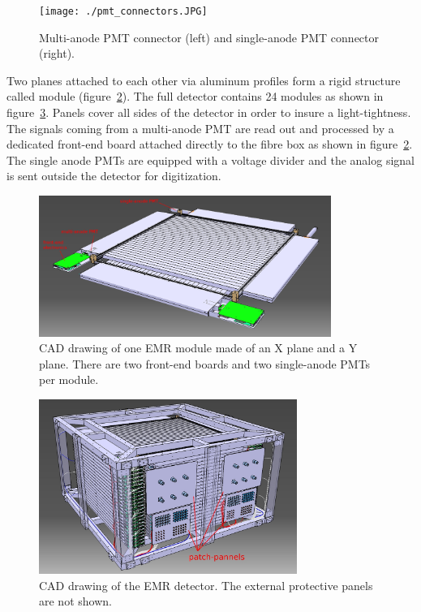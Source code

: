 \documentclass[a4paper,11pt]{article}
\begin{document}
\begin{figure}[htp!]
 \centering
 \texttt{[image: ./pmt\_connectors.JPG]}
 \caption[PMT connectors]{Multi-anode PMT connector (left) and single-anode PMT connector (right).}
 \label{fig:pmt_connectors}
\end{figure}

Two planes attached to each other via aluminum profiles form a rigid structure called module (figure~\ref{fig:emr_module}). 
The full detector contains 24 modules as shown in figure~\ref{fig:emr_full_cad_model}. Panels cover all sides of the detector
in order to insure a light-tightness. The signals coming from a multi-anode PMT are read out and processed by a dedicated front-end board
attached directly to the fibre box as shown in figure~\ref{fig:emr_module}. The single anode PMTs are equipped with a
voltage divider and the analog signal is sent outside the detector for digitization.

\begin{figure}[htb]
 \centering
 \includegraphics[width=0.85\textwidth]{./emr_module}
 \caption[CAD drawing of one EMR module]{CAD drawing of one EMR module made of an X plane and a Y plane. There are two front-end boards and two single-anode PMTs per module.}
 \label{fig:emr_module}
\end{figure}

\begin{figure}[htp!]
 \centering
 \includegraphics[width=0.75\textwidth]{./emr_cad_model_1}
 \caption[CAD drawing of the EMR detector]{CAD drawing of the EMR detector. The external protective panels are not shown.}
 \label{fig:emr_full_cad_model}
\end{figure}
\end{document}
